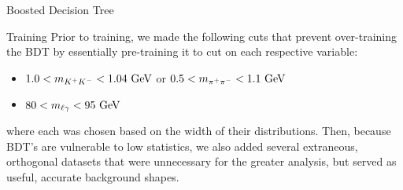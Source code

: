 \begin{section}{Boosted Decision Tree}
\begin{subsection}{Training}\label{training}
Prior to training, we made the following cuts that prevent over-training the BDT by essentially pre-training it to cut on each respective variable:

\begin{itemize}
    \item $1.0 < m_{K^{+}K^{-}} < 1.04\textnormal{ GeV}$ or $0.5 < m_{\pi^{+}\pi^{-}} < 1.1\textnormal{ GeV}$
    \item $80 < m_{\ell\gamma} < 95\textnormal{ GeV}$
\end{itemize}

\noindent where each was chosen based on the width of their distributions. Then, because BDT's are vulnerable to low statistics, we also added several extraneous, orthogonal datasets that were unnecessary for the greater analysis, but served as useful, accurate background shapes.


\end{subsection}
\end{section}

